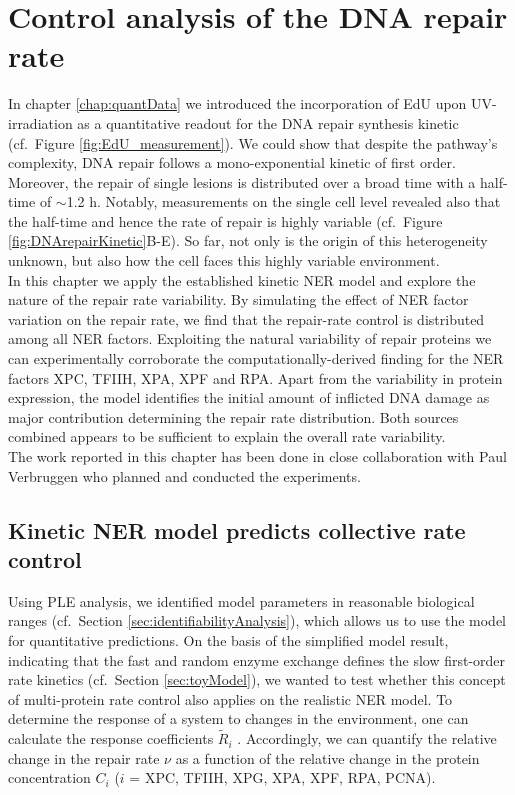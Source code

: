 \chapter{Control analysis of the DNA repair rate}
\label{chap:robustRepair}

In chapter \ref{chap:quantData} we introduced the incorporation of EdU upon UV-irradiation as a quantitative readout for the DNA repair synthesis kinetic (cf.\ Figure \ref{fig:EdU_measurement}). We could show that despite the pathway's complexity, DNA repair follows a mono-exponential kinetic of first order. Moreover, the repair of single lesions is distributed over a broad time with a half-time of $\sim$1.2 h. Notably, measurements on the single cell level revealed also that the half-time and hence the rate of repair is highly variable (cf.\ Figure \ref{fig:DNArepairKinetic}B-E). So far, not only is the origin of this heterogeneity unknown, but also how the cell faces this highly variable environment.\\  
In this chapter we apply the established kinetic NER model and explore the nature of the repair rate variability. By simulating the effect of NER factor variation on the repair rate, we find that the repair-rate control is distributed among all NER factors. Exploiting the natural variability of repair proteins we can experimentally corroborate the computationally-derived finding for the NER factors XPC, TFIIH, XPA, XPF and RPA. Apart from the variability in protein expression, the model identifies the initial amount of inflicted DNA damage as major contribution determining the repair rate distribution. Both sources combined appears to be sufficient to explain the overall rate variability.\\     

The work reported in this chapter has been done in close collaboration with Paul Verbruggen who planned and conducted the experiments.

\section{Kinetic NER model predicts collective rate control}
\label{sec:repairControl}
Using PLE analysis, we identified model parameters in reasonable biological ranges (cf.\ Section \ref{sec:identifiabilityAnalysis}), which allows us to use the model for quantitative predictions. On the basis of the simplified model result, indicating that the fast and random enzyme exchange defines the slow first-order rate kinetics (cf.\ Section \ref{sec:toyModel}), we wanted to test whether this concept of multi-protein rate control also applies on the realistic NER model. To determine the response of a system to changes in the environment, one can calculate the response coefficients $\tilde{R}_i$ \cite{Hofmeyr1991,Fell1992}. Accordingly, we can quantify the relative change in the repair rate $\nu$ as a function of the relative change in the protein concentration $C_i$ ($i$ = XPC, TFIIH, XPG, XPA, XPF, RPA, PCNA).

